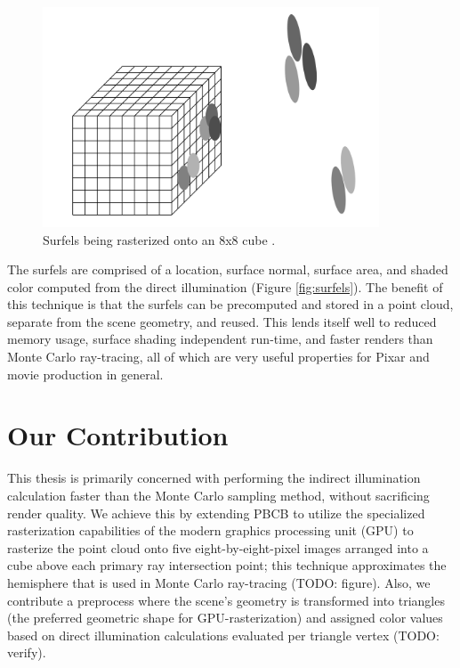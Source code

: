 \begin{figure}[p]
   \centering
   \includegraphics[width=100mm]{../img/surfel_raster.png}
   \captionfonts
   \caption{Surfels being rasterized onto an 8x8 cube \cite{bib:christensen_slides}.}
   \label{fig:surfel_raster}
\end{figure}

The surfels are comprised of a location, surface normal, surface area, and shaded color computed from the direct illumination (Figure \ref{fig:surfels}). The benefit of this technique is that the surfels can be precomputed and stored in a point cloud, separate from the scene geometry, and reused. This lends itself well to reduced memory usage, surface shading independent run-time, and faster renders than Monte Carlo ray-tracing, all of which are very useful properties for Pixar and movie production in general.

\section{Our Contribution}
This thesis is primarily concerned with performing the indirect illumination calculation faster than the Monte Carlo sampling method, without sacrificing render quality. We achieve this by extending PBCB to utilize the specialized rasterization capabilities of the modern graphics processing unit (GPU) to rasterize the point cloud onto five eight-by-eight-pixel images arranged into a cube above each primary ray intersection point; this technique approximates the hemisphere that is used in Monte Carlo ray-tracing (TODO: figure). Also, we contribute a preprocess where the scene's geometry is transformed into triangles (the preferred geometric shape for GPU-rasterization) and assigned color values based on direct illumination calculations evaluated per triangle vertex (TODO: verify).

